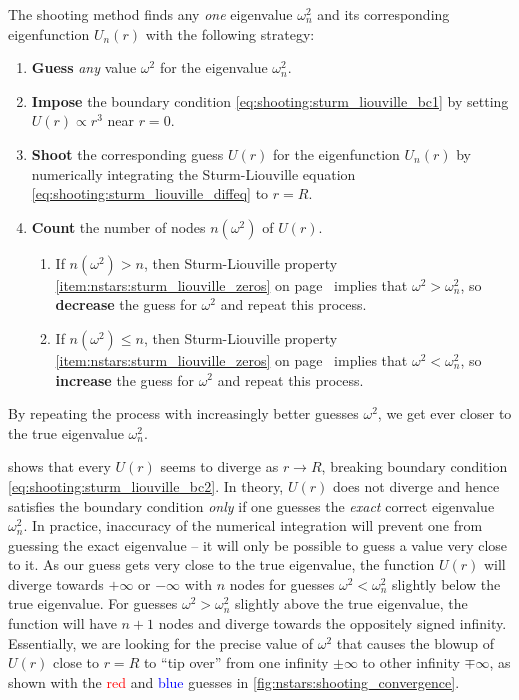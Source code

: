 The shooting method finds any \emph{one} eigenvalue $\omega_n^2$ and its corresponding eigenfunction $U_n(r)$ with the following strategy:
\begin{enumerate}
\item \textbf{Guess} \emph{any} value $\omega^2$ for the eigenvalue $\omega_n^2$.
\item \textbf{Impose} the boundary condition \eqref{eq:shooting:sturm_liouville_bc1} by setting $U(r) \propto r^3$ near $r = 0$. \label{item:shooting:bc1}
\item \textbf{Shoot} the corresponding guess $U(r)$ for the eigenfunction $U_n(r)$ by numerically integrating the Sturm-Liouville equation \eqref{eq:shooting:sturm_liouville_diffeq} to $r=R$. \label{item:shooting:shoot}
\item \textbf{Count} the number of nodes $n(\omega^2)$ of $U(r)$.
      \begin{enumerate}
      \item If $n(\omega^2) > n$, then Sturm-Liouville property \ref{item:nstars:sturm_liouville_zeros} on page~\pageref{item:nstars:sturm_liouville_zeros} implies that $\omega^2 > \omega_n^2$, so \textbf{decrease} the guess for $\omega^2$ and repeat this process. \label{item:shooting:count_decrease}
      \item If $n(\omega^2) \leq n$, then Sturm-Liouville property \ref{item:nstars:sturm_liouville_zeros} on page~\pageref{item:nstars:sturm_liouville_zeros} implies that $\omega^2 < \omega_n^2$, so \textbf{increase} the guess for $\omega^2$ and repeat this process. \label{item:shooting:count_increase}
      \end{enumerate}
      \label{item:shooting:count}
\end{enumerate}
By repeating the process with increasingly better guesses $\omega^2$, we get ever closer to the true eigenvalue $\omega_n^2$.

 shows that every $U(r)$ seems to diverge as $r \rightarrow R$, breaking boundary condition \eqref{eq:shooting:sturm_liouville_bc2}.
In theory, $U(r)$ does not diverge and hence satisfies the boundary condition \emph{only} if one guesses the \emph{exact} correct eigenvalue $\omega_n^2$.
In practice, inaccuracy of the numerical integration will prevent one from guessing the exact eigenvalue -- it will only be possible to guess a value very close to it.
As our guess gets very close to the true eigenvalue, the function $U(r)$ will diverge towards $+\infty$ or $-\infty$ with $n$ nodes for guesses $\omega^2 < \omega_n^2$ slightly below the true eigenvalue.
For guesses $\omega^2 > \omega_n^2$ slightly above the true eigenvalue, the function will have $n+1$ nodes and diverge towards the oppositely signed infinity.
Essentially, we are looking for the precise value of $\omega^2$ that causes the blowup of $U(r)$ close to $r=R$ to ``tip over'' from one infinity $\pm \infty$ to other infinity $\mp \infty$, as shown with the \textcolor{red}{red} and \textcolor{blue}{blue} guesses in \cref{fig:nstars:shooting_convergence}.

